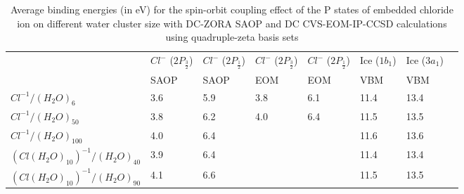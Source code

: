 \documentclass[a4paper,11pt]{report}
\begin{document}
\begin{table}[H]\small
\begin{center}
\captionsetup{font=footnotesize}
\caption{Average binding energies (in eV) for the spin-orbit coupling effect of the P states of embedded chloride ion on different water cluster size with DC-ZORA SAOP and DC CVS-EOM-IP-CCSD calculations using quadruple-zeta basis sets} \label{tab:1}
\begin{tabular}{|l|l|l|l|l|l|l|l|}
\hline
&$Cl^{-}$ ($2P_{\frac{3}{2}}$)&$Cl^{-}$ ($2P_{\frac{1}{2}}$)&$Cl^{-}$ ($2P_{\frac{3}{2}}$)&$Cl^{-}$ ($2P_{\frac{1}{2}}$)&Ice ($1b_{1}$)&Ice ($3a_{1}$)\\
&SAOP &SAOP&EOM&EOM&\hspace*{0.3cm}VBM &\hspace*{0.3cm}VBM\\ 
\hline
$Cl^{-1}/(H_{2}O)_{6}$&\hspace*{0.5cm}3.6&\hspace*{0.5cm}5.9&\hspace*{0.5cm}3.8&\hspace*{0.5cm}6.1&\hspace*{0.5cm}11.4&\hspace*{0.5cm}13.4\\
\hline
$Cl^{-1}/(H_{2}O)_{50}$&\hspace*{0.5cm}3.8&\hspace*{0.5cm}6.2&\hspace*{0.5cm}4.0&\hspace*{0.5cm}6.4&\hspace*{0.5cm}11.5&\hspace*{0.5cm}13.5\\
\hline
$Cl^{-1}/(H_{2}O)_{100}$&\hspace*{0.5cm}4.0&\hspace*{0.5cm}6.4&\hspace*{0.5cm}&\hspace*{0.5cm}&\hspace*{0.5cm}11.6&\hspace*{0.5cm}13.6\\
\hline
$(Cl(H_{2}O)_{10})^{-1}/(H_{2}O)_{40}$&\hspace*{0.5cm}3.9&\hspace*{0.5cm}6.4&\hspace*{0.5cm}&\hspace*{0.5cm}&\hspace*{0.5cm}11.4&\hspace*{0.5cm}13.4\\
\hline
$(Cl(H_{2}O)_{10})^{-1}/(H_{2}O)_{90}$&\hspace*{0.5cm}4.1&\hspace*{0.5cm}6.6&\hspace*{0.5cm}&\hspace*{0.5cm}&\hspace*{0.5cm}11.5&\hspace*{0.5cm}13.5\\
\hline
\end{tabular}
\label{table1n}
\end{center}
\end{table}
\end{document}
